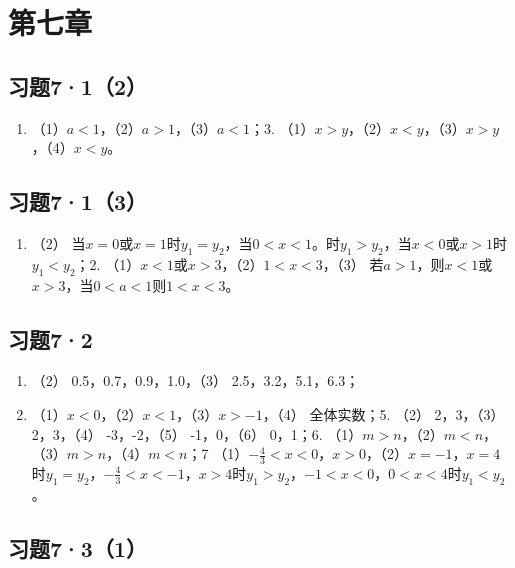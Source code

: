 \section{第七章}

\subsection{习题7·1（2）}

\begin{enumerate}[start=2]
\item
  （1）\(a < 1\)，（2）\(a > 1\)，（3）\(a < 1\)；3.
  （1）\(x > y\)，（2）\(x < y\)，（3）\(x > y\)，（4）\(x < y\)。
\end{enumerate}

\subsection{习题7·1（3）}

\begin{enumerate}
\item
  （2）
  当\(x = 0\)或\(x = 1\)时\(y_{1} = y_{2}\)，当\(0 < x < 1\)。时\(y_{1} > y_{2}\)，当\(x < 0\)或\(x > 1\)时\(y_{1} < y_{2}\)；2.
  （1）\(x < 1\)或\(x > 3\)，（2）\(1 < x < 3\)，（3）
  若\(a > 1\)，则\(x < 1\)或\(x > 3\)，当\(0 < a < 1\)则\(1 < x < 3\)。
\end{enumerate}

\subsection{习题7·2}

\begin{enumerate}
\item
  （2） 0.5，0.7，0.9，1.0，（3） 2.5，3.2，5.1，6.3；
\item
  （1）\(x < 0\)，（2）\(x < 1\)，（3）\(x > -1\)，（4） 全体实数；5.
  （2） 2，3，（3） 2，3，（4） -3，-2，（5） -1，0，（6） 0，1；6.
  （1）\(m > n\)，（2）\(m < n\)，（3）\(m > n\)，（4）\(m < n\)；7
  （1）\(-\frac{4}{3} < x < 0\)，\(x > 0\)，（2）\(x = -1\)，\(x = 4\)时\(y_1 = y_2\)，\(-\frac{4}{3} < x < -1\)，\(x > 4\)时\(y_1 > y_2\)，\(-1 < x < 0\)，\(0 < x < 4\)时\(y_1 < y_2\)。
\end{enumerate}

\subsection{习题7·3（1）}

